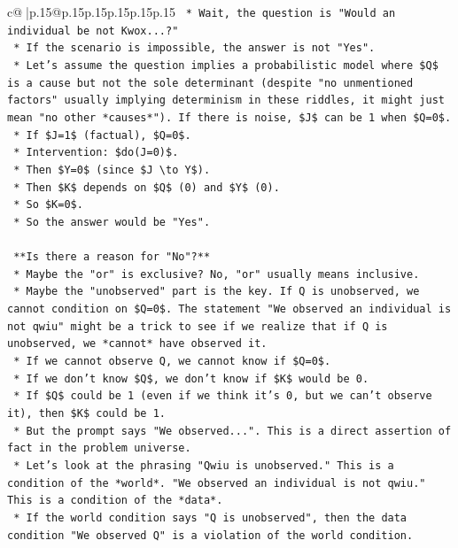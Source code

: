 \documentclass{article}
\begin{document}
{\begin{supertabular}{c@{$\;$}|p{.15\linewidth}@{}p{.15\linewidth}p{.15\linewidth}p{.15\linewidth}p{.15\linewidth}p{.15\linewidth}}
{{{\texttt{    *   Wait, the question is "Would an individual be not Kwox...?"} \\
\texttt{    *   If the scenario is impossible, the answer is not "Yes".} \\
\texttt{    *   Let's assume the question implies a probabilistic model where \$Q\$ is a cause but not the sole determinant (despite "no unmentioned factors" usually implying determinism in these riddles, it might just mean "no other *causes*"). If there is noise, \$J\$ can be 1 when \$Q=0\$.} \\
\texttt{    *   If \$J=1\$ (factual), \$Q=0\$.} \\
\texttt{    *   Intervention: \$do(J=0)\$.} \\
\texttt{    *   Then \$Y=0\$ (since \$J \textbackslash{}to Y\$).} \\
\texttt{    *   Then \$K\$ depends on \$Q\$ (0) and \$Y\$ (0).} \\
\texttt{    *   So \$K=0\$.} \\
\texttt{    *   So the answer would be "Yes".} \\
\\ 
\texttt{    **Is there a reason for "No"?**} \\
\texttt{    *   Maybe the "or" is exclusive? No, "or" usually means inclusive.} \\
\texttt{    *   Maybe the "unobserved" part is the key. If Q is unobserved, we cannot condition on \$Q=0\$. The statement "We observed an individual is not qwiu" might be a trick to see if we realize that if Q is unobserved, we *cannot* have observed it.} \\
\texttt{    *   If we cannot observe Q, we cannot know if \$Q=0\$.} \\
\texttt{    *   If we don't know \$Q\$, we don't know if \$K\$ would be 0.} \\
\texttt{    *   If \$Q\$ could be 1 (even if we think it's 0, but we can't observe it), then \$K\$ could be 1.} \\
\texttt{    *   But the prompt says "We observed...". This is a direct assertion of fact in the problem universe.} \\
\texttt{    *   Let's look at the phrasing "Qwiu is unobserved." This is a condition of the *world*. "We observed an individual is not qwiu." This is a condition of the *data*.} \\
\texttt{    *   If the world condition says "Q is unobserved", then the data condition "We observed Q" is a violation of the world condition.} \\
}}}
\end{supertabular}}
\end{document}
